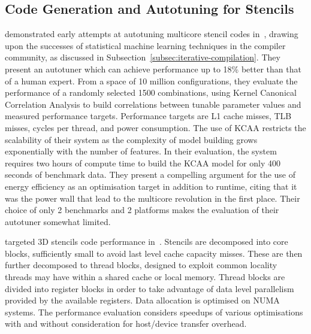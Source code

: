 \documentclass[nonatbib,preprint,10pt]{sigplanconf}
\begin{document}
\subsection{Code Generation and Autotuning for Stencils}


\citeauthor{Ganapathi2009} demonstrated early attempts at autotuning
multicore stencil codes in~\cite{Ganapathi2009}, drawing upon the
successes of statistical machine learning techniques in the compiler
community, as discussed in
Subsection~\ref{subsec:iterative-compilation}. They present an autotuner
which can achieve performance up to 18\% better than that of a human
expert. From a space of 10 million configurations, they evaluate the
performance of a randomly selected 1500 combinations, using Kernel
Canonical Correlation Analysis to build correlations between tunable
parameter values and measured performance targets. Performance targets
are L1 cache misses, TLB misses, cycles per thread, and power
consumption. The use of KCAA restricts the scalability of their system
as the complexity of model building grows exponentially with the
number of features. In their evaluation, the system requires two hours
of compute time to build the KCAA model for only 400 seconds of
benchmark data. They present a compelling argument for the use of
energy efficiency as an optimisation target in addition to runtime,
citing that it was the power wall that lead to the multicore
revolution in the first place. Their choice of only 2 benchmarks and 2
platforms makes the evaluation of their autotuner somewhat limited.

\citeauthor{Berkeley2009} targeted 3D stencils code performance
in~\cite{Berkeley2009}. Stencils are decomposed into core blocks,
sufficiently small to avoid last level cache capacity misses. These
are then further decomposed to thread blocks, designed to exploit
common locality threads may have within a shared cache or local
memory. Thread blocks are divided into register blocks in order to
take advantage of data level parallelism provided by the available
registers. Data allocation is optimised on NUMA systems. The
performance evaluation considers speedups of various optimisations
with and without consideration for host/device transfer overhead.
\end{document}
